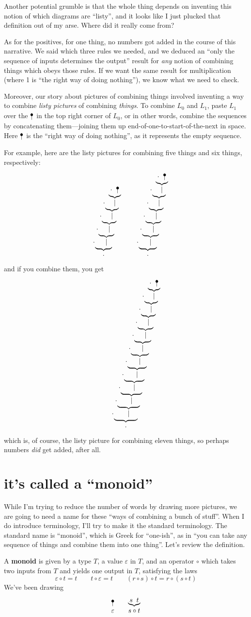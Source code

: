 \documentclass{book}
\begin{document}
Another potential grumble is that the whole thing depends on inventing this notion of which diagrams are ``listy'', and it looks like I just plucked that definition out of my arse. Where did it really come from?

As for the positives, for one thing, no numbers got added in the course of this narrative. We said which three rules we needed, and we deduced an ``only the sequence of inputs determines the output'' result for \emph{any} notion of combining things which obeys those rules. If we want the same result for multiplication (where 1 is ``the right way of doing nothing''), we know what we need to check.

Moreover, our story about pictures of combining things involved inventing a way to combine \emph{listy pictures} of combining \emph{things}. To combine $L_0$ and $L_1$, paste $L_1$ over the $\naw{}$ in the top right corner of $L_0$, or in other words, combine the sequences by concatenating them---joining them up end-of-one-to-start-of-the-next in space. Here $\naw{}$ is the ``right way of doing nothing'', as it represents the empty sequence. 

For example, here are the listy pictures for combining five things and six things, respectively:
\newcommand{\mo}[1]{\wye{\cdot}{#1}{\mid}}
\[
\wye{\cdot}{\mo{\mo{\mo{\mo{\naw{}}}}}}{\cdot}
\qquad\qquad
\wye{\cdot}{\mo{\mo{\mo{\mo{\mo{\naw{}}}}}}}{\cdot}
\]
and if you combine them, you get
\[
\wye{\cdot}{\mo{\mo{\mo{\mo{\mo{\mo{\mo{\mo{\mo{\mo{\naw{}}}}}}}}}}}}{\cdot}
\]
which is, of course, the listy picture for combining eleven things, so perhaps numbers \emph{did} get added, after all.


\section{it's called a ``monoid''}

While I'm trying to reduce the number of words by drawing more pictures, we are going to need a name for these ``ways of combining a bunch of stuff''. When I do introduce terminology, I'll try to make it the standard terminology. The standard name is ``monoid'', which is Greek for ``one-ish'', as in ``you can take any sequence of things and combine them into one thing''. Let's review the definition.

\newcommand{\neu}{\varepsilon}
\newcommand{\com}{\circ}
A \textbf{monoid} is given by a type $T$, a value $\neu$ in $T$, and an operator $\com$ which takes two inputs from $T$ and yields one output in $T$, satisfying the laws
\[
\neu\com t = t \qquad
t\com\neu = t \qquad
(r\com s)\com t = r\com(s\com t)
\]
We've been drawing
\[
\naw\neu \qquad \wye st{s\com t}
\]
\end{document}
